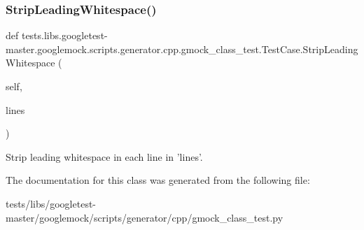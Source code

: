 \subsubsection{\texorpdfstring{Strip\+Leading\+Whitespace()}{StripLeadingWhitespace()}}
{\footnotesize\ttfamily def tests.\+libs.\+googletest-\/master.\+googlemock.\+scripts.\+generator.\+cpp.\+gmock\+\_\+class\+\_\+test.\+Test\+Case.\+Strip\+Leading\+Whitespace (\begin{DoxyParamCaption}\item[{}]{self,  }\item[{}]{lines }\end{DoxyParamCaption})}

\begin{DoxyVerb}Strip leading whitespace in each line in 'lines'.\end{DoxyVerb}
 

The documentation for this class was generated from the following file\+:\begin{DoxyCompactItemize}
\item 
tests/libs/googletest-\/master/googlemock/scripts/generator/cpp/gmock\+\_\+class\+\_\+test.\+py\end{DoxyCompactItemize}
